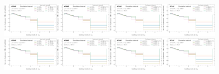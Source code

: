 \begin{figure}[h!]
\centering
\includegraphics[width=0.25\textwidth,page=1]{figures/SimResults/MultiFold_Lepton_SystEffect.pdf}\includegraphics[width=0.25\textwidth,page=2]{figures/SimResults/MultiFold_Lepton_SystEffect.pdf}\includegraphics[width=0.25\textwidth,page=3]{figures/SimResults/MultiFold_Lepton_SystEffect.pdf}\includegraphics[width=0.25\textwidth,page=4]{figures/SimResults/MultiFold_Lepton_SystEffect.pdf}\\
\includegraphics[width=0.25\textwidth,page=5]{figures/SimResults/MultiFold_Lepton_SystEffect.pdf}\includegraphics[width=0.25\textwidth,page=6]{figures/SimResults/MultiFold_Lepton_SystEffect.pdf}\includegraphics[width=0.25\textwidth,page=7]{figures/SimResults/MultiFold_Lepton_SystEffect.pdf}\includegraphics[width=0.25\textwidth,page=8]{figures/SimResults/MultiFold_Lepton_SystEffect.pdf}\\

\end{figure}

